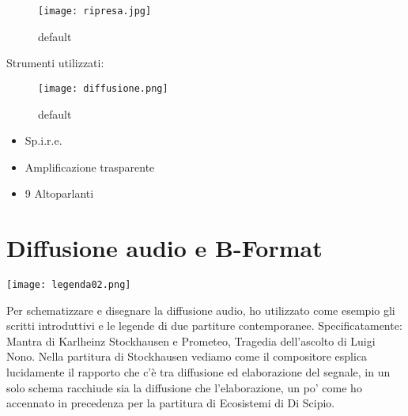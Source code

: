 \begin{figure}[htbp]
\begin{center}
\texttt{[image: ripresa.jpg]}
\caption{default}
\label{default}
\end{center}
\end{figure}


Strumenti utilizzati:


\begin{figure}[htbp]
\begin{center}
\texttt{[image: diffusione.png]}
\caption{default}
\label{default}
\end{center}
\end{figure}

\begin{itemize}
	\item{Sp.i.r.e.}
	\item{Amplificazione trasparente}
	\item{9 Altoparlanti}
\end{itemize}


\section{Diffusione audio e B-Format}
\begin{center}
\texttt{[image: legenda02.png]}
\end{center}


Per schematizzare e disegnare la diffusione audio, ho utilizzato come esempio gli scritti introduttivi e le legende di due partiture contemporanee. Specificatamente: Mantra di Karlheinz Stockhausen e Prometeo, Tragedia dell'ascolto di Luigi Nono. Nella partitura di Stockhausen vediamo come il compositore esplica lucidamente il rapporto che c'è tra diffusione ed elaborazione del segnale, in un solo schema racchiude sia la diffusione che l'elaborazione, un po' come ho accennato in precedenza per la partitura di Ecosistemi di Di Scipio.

